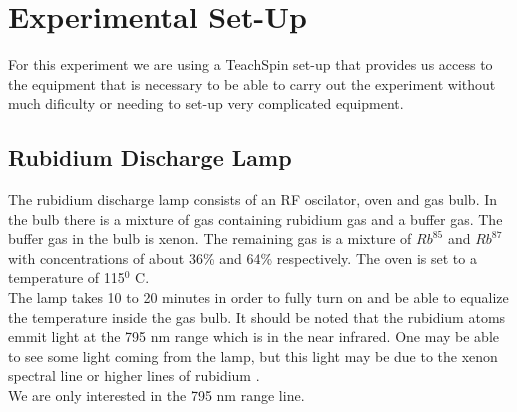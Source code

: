 \documentclass[twocolumn]{article}
\begin{document}
\section{Experimental Set-Up}
For this experiment we are using a TeachSpin set-up that provides us access to 
the equipment that is necessary to be able to carry out the experiment without 
much dificulty or needing to set-up very complicated equipment.
\subsection{Rubidium Discharge Lamp}
The rubidium discharge lamp consists of an RF oscilator, oven and gas bulb. In 
the bulb there is a mixture of gas containing rubidium gas and a buffer gas. 
The buffer gas in the bulb is xenon. The remaining gas is a mixture of 
$Rb^{85}$ and $Rb^{87}$ with concentrations of about 36\% and 64\% respectively.
The oven is set to a temperature of 115$^0$ C.
\\
The lamp takes 10 to 20 minutes in order to fully turn on and be able to 
equalize the temperature inside the gas bulb. It should be noted that the 
rubidium atoms emmit light at the 795 nm range which is in the near infrared. 
One may be able to see some light coming from the lamp, but this light may be 
due to the xenon spectral line or higher lines of rubidium \cite{ref:3}.
\\
We are only interested in the 795 nm range line.
\end{document}
